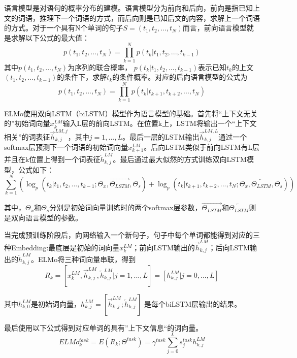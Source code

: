 语言模型是对语句的概率分布的建模。语言模型分为前向和后向，前向是指已知上文的词语，推理下一个词语的方式，而后向则是已知后文的内容，求解上一个词语的方式。对于一个具有N个单词的句子$S=(t_1, t_2, ..., t_N)$而言，前向语言模型就是求解以下公式的最大值：
\begin{equation}
p(t_1, t_2, ..., t_N)=\prod_{k=1}^N p(t_k|t_1,t_2,...,t_{k-1})
\end{equation}
其中$p(t_1, t_2, ..., t_N)$为序列的联合概率，
$p(t_k|t_1, t_2,..., t_{k-1})$表示已知$t_k$的上文$(t_1, t_2, ..., t_{k-1})$的条件下，求解$t_k$的条件概率。对应的后向语言模型的公式为
\begin{equation}
p(t_1, t_2, ..., t_N)=\prod_{k=1}^N p(t_k|t_{k+1},t_{k+2},...,t_N)
\end{equation}

ELMo使用双向LSTM（biLSTM）模型作为语言模型的基础。首先将“上下文无关的”初始词向量$x{_k^{LM}}$输入L层的前向LSTM。在位置k上，LSTM将输出一个“上下文相关”的词表征$\vec{h}_{k,j}^{LM,j}$，其中$j = 1, ..., L$。最后一层的LSTM输出$\vec{h}_{k,j}^{LM,L}$通过一个softmax层预测下一个词语的初始词向量$x{_{k+1}^{LM}}$。后向LSTM类似于前向LSTM有L层并且在k位置上得到一个词表征$\overleftarrow{h}_{k,j}^{LM}$。最后通过最大似然的方式训练双向LSTM模型，公式如下：
\begin{equation}
\sum_{k=1}^N(\log_p(t_k|t_1, t_2,..., t_{k-1};\Theta_x,\overrightarrow{\Theta_{LSTM}},\Theta_s) + \log_p(t_k|t_{k+1},t_{k+2},...,t_N;\Theta_x,\overleftarrow{\Theta_{LSTM}},\Theta_s)
)
\end{equation}

其中，$\Theta_x$和$\Theta_s$分别是初始词向量训练时的两个softmax层参数，$\overrightarrow{\Theta_{LSTM}}$和$\overleftarrow{\Theta_{LSTM}}$则是双向语言模型的参数。

当完成预训练阶段后，向网络输入一个新句子，句子中每个单词都能得到对应的三种Embedding:最底层是初始的词向量$x{_k^{LM}}$；前向LSTM输出的$\overrightarrow{h}_{k,j}^{LM}$；后向LSTM输出的$\overleftarrow{h}_{k,j}^{LM}$。ELMo将三种词向量串联，得到
\begin{equation}
R_k = 
[x_k^{LM}, \overrightarrow{h}_{k,j}^{LM}, \overleftarrow{h}_{k,j}^{LM} | j = 1, ..., L]
= [h_{k,j}^{LM} | j = 0, ..., L]
\end{equation}

其中$h_{k,0}^{LM}$是初始词向量，$h_{k,j}^{LM} = [\overrightarrow{h}_{k,j}^{LM}; \overleftarrow{h}_{k,j}^{LM}]$ 是每个biLSTM层输出的结果。

最后使用以下公式得到对应单词的具有”上下文信息“的词向量。
\begin{equation}
ELMo_k^{task} = E(R_k; \Theta^{task}) = \gamma^{task}\sum_{j=0}^L s_j^{task} h_{k,j}^{LM}
\end{equation}

